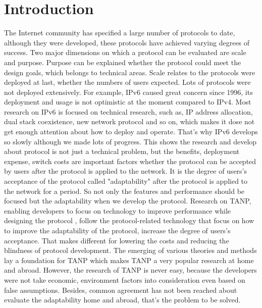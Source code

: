 \documentclass{article}
\begin{document}
\section{Introduction}
The Internet community has specified a large number of protocols to date, although they were developed, these protocols 
have achieved varying degrees of success. Two major dimensions on which a protocol can be evaluated are scale and purpose. 
Purpose can be explained whether the protocol could meet the design goals, which belongs to technical areas. Scale relates 
to the protocols were deployed at last, whether the numbers of users expected. Lots of protocols were not deployed  extensively. 
For example, IPv6 caused great concern since 1996, its deployment and usage is not optimistic at the moment compared to IPv4. 
 Most research on IPv6 is focused on technical research, such as, IP address allocation, dual stack coexistence, new network 
 protocol and so on, which makes it dose not get enough attention about how to deploy and operate. That's why IPv6 develops 
 so slowly although we made lots of progress.  This shows the research and develop about protocol is not just a technical 
 problem, but the benefits, deployment expense, switch costs are important factors whether the protocol can be accepted by 
 users after the protocol is applied to the network. It is the degree of users's acceptance of the protocol called "adaptability" 
 after the protocol is applied to the network for a period. So not only the features and performance should be focused but the 
 adaptability when we develop the protocol. Research on TANP, enabling developers to focus on technology to improve performance 
 while designing the protocol , follow the protocol-related technology that focus on how to improve the adaptability of the protocol, 
 increase the degree of users's acceptance. That makes different for lowering the costs and reducing the blindness of protocol development.  
 The emerging of various theories and methods lay a foundation for TANP which makes  TANP a very popular research at home and abroad. 
 However,  the research of TANP is never easy, because the developers were not take economic, environment factors into consideration 
 even based on false assumptions. Besides, common agreement has not been reached about evaluate the adaptability home and abroad, 
 that's the problem to be solved.
\end{document}
